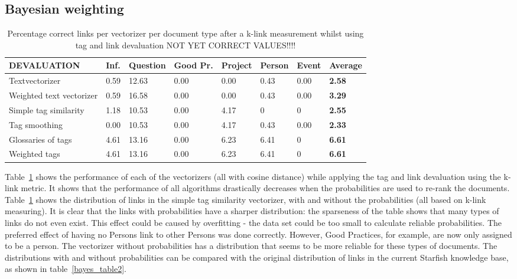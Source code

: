 \subsection{Bayesian weighting}
\begin{table}
\begin{tabular}{| l | l | l | l | l | l | l | l |}
\hline
DEVALUATION & Inf. &  Question &  Good Pr.& Project & Person &  Event & {\bf Average} \\
\hline
Textvectorizer & 0.59 & 12.63 & 0.00 & 0.00 & 0.43 & 0.00 & {\bf 2.58}\\
Weighted text vectorizer & 0.59 & 16.58 & 0.00 & 0.00 & 0.43 & 0.00 & {\bf 3.29} \\ 
Simple tag similarity & 1.18 & 10.53 & 0.00 & 4.17& 0 & 0 & {\bf 2.55}\\
Tag smoothing & 0.00 & 10.53 & 0.00 & 4.17 & 0.43 & 0.00 & {\bf 2.33}\\
Glossaries of tags & 4.61 & 13.16 & 0.00 & 6.23 & 6.41 & 0 & {\bf 6.61}\\
Weighted tags & 4.61 & 13.16 & 0.00 & 6.23 & 6.41 & 0 & {\bf 6.61}\\
\hline
\end{tabular}
\caption{Percentage correct links per vectorizer per document type after a k-link measurement whilst using tag and link devaluation NOT YET CORRECT VALUES!!!!}
\label{bayes_table1}
\end{table}

Table~\ref{bayes_table1} shows the performance of each of the vectorizers (all
with cosine distance) while applying the tag and link devaluation using the
k-link metric. It shows that the performance of all algorithms drastically
decreases when the probabilities are used to re-rank the documents. 
Table~\ref{bayes_table1}  shows the distribution of links in the simple tag
similarity vectorizer, with and without the probabilities (all based on k-link
measuring). It is clear that the links with probabilities have a sharper
distribution: the sparseness of the table shows that many types of links do not
even exist. This effect could be caused by overfitting - the data set could be
too small to calculate reliable probabilities. The preferred effect of having no
Persons link to other Persons was done correctly. However, Good Practices, for
example, are now only assigned to be a person. The vectorizer without
probabilities has a distribution that seems to be more reliable for these types
of documents. The distributions with and without probabilities can be compared
with the original distribution of links in the current Starfish knowledge base,
as shown in table~\ref{bayes_table2}.  

